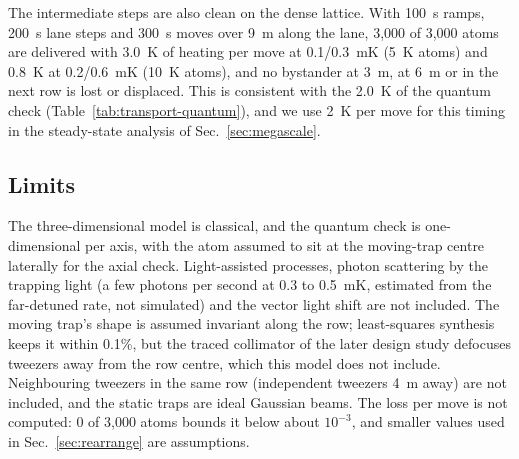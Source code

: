The intermediate steps are also clean on the dense lattice. With 100~\textmu s ramps, 200~\textmu s lane steps and 300~\textmu s moves over 9~\textmu m along the lane, 3,000 of 3,000 atoms are delivered with 3.0~\textmu K of heating per move at 0.1/0.3~mK (5~\textmu K atoms) and 0.8~\textmu K at 0.2/0.6~mK (10~\textmu K atoms), and no bystander at 3~\textmu m, at 6~\textmu m or in the next row is lost or displaced. This is consistent with the 2.0~\textmu K of the quantum check (Table~\ref{tab:transport-quantum}), and we use 2~\textmu K per move for this timing in the steady-state analysis of Sec.~\ref{sec:megascale}.

\subsection{Limits}\label{sec:transport-limits}

The three-dimensional model is classical, and the quantum check is one-dimensional per axis, with the atom assumed to sit at the moving-trap centre laterally for the axial check. Light-assisted processes, photon scattering by the trapping light (a few photons per second at 0.3 to 0.5~mK, estimated from the far-detuned rate, not simulated) and the vector light shift are not included. The moving trap's shape is assumed invariant along the row; least-squares synthesis keeps it within 0.1\%, but the traced collimator of the later design study defocuses tweezers away from the row centre, which this model does not include. Neighbouring tweezers in the same row (independent tweezers 4~\textmu m away) are not included, and the static traps are ideal Gaussian beams. The loss per move is not computed: 0 of 3,000 atoms bounds it below about $10^{-3}$, and smaller values used in Sec.~\ref{sec:rearrange} are assumptions.
